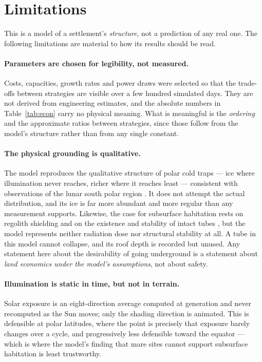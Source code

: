 \section{Limitations}
\label{sec:limitations}

This is a model of a settlement's \emph{structure}, not a prediction of any
real one. The following limitations are material to how its results should be
read.

\paragraph{Parameters are chosen for legibility, not measured.}
Costs, capacities, growth rates and power draws were selected so that the
trade-offs between strategies are visible over a few hundred simulated days.
They are not derived from engineering estimates, and the absolute numbers in
Table~\ref{tab:econ} carry no physical meaning. What is meaningful is the
\emph{ordering} and the approximate ratios between strategies, since those
follow from the model's structure rather than from any single constant.

\paragraph{The physical grounding is qualitative.}
The model reproduces the qualitative structure of polar cold traps --- ice
where illumination never reaches, richer where it reaches least --- consistent
with observations of the lunar south polar region
\citep{paige2010diviner,colaprete2010water}. It does not attempt the actual
distribution, and its ice is far more abundant and more regular than any
measurement supports. Likewise, the case for subsurface habitation rests on
regolith shielding \citep{jia2010radiation,naito2020radiation} and on the
existence and stability of intact tubes
\citep{kaku2017intact,blair2017stability}, but the model represents neither
radiation dose nor structural stability at all. A tube
in this model cannot collapse, and its roof depth is recorded but unused. Any
statement here about the desirability of going underground is a statement about
\emph{land economics under the model's assumptions}, not about safety.

\paragraph{Illumination is static in time, but not in terrain.}
Solar exposure is an eight-direction average computed at generation and never
recomputed as the Sun moves; only the shading direction is animated. This is
defensible at polar latitudes, where the point is precisely that exposure
barely changes over a cycle, and progressively less defensible toward the
equator --- which is where the model's finding that mare sites cannot support
subsurface habitation is least trustworthy.

